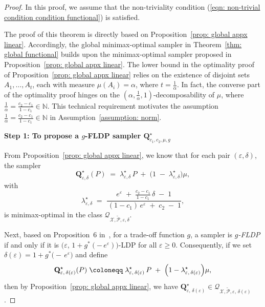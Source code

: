 \documentclass[accepted]{article}
\theoremstyle{plain} %
\theoremstyle{definition}
\theoremstyle{remark}
\newcommand{\bQ}{\mathbf{Q}}
\begin{document}
\begin{proof}
In this proof, we assume that the non-triviality condition (\ref{eqn: non-trivial condition condition functional}) is satisfied.



The proof of this theorem is directly based on Proposition~\ref{prop: global appx linear}. Accordingly, the global minimax-optimal sampler in Theorem~\ref{thm: global functional} builds upon the minimax-optimal sampler proposed in Proposition~\ref{prop: global appx linear}. The lower bound in the optimality proof of Proposition~\ref{prop: global appx linear} relies on the existence of disjoint sets \( A_1, \ldots, A_t \), each with measure \( \mu(A_i) = \alpha \), where \( t = \frac{1}{\alpha} \). In fact, the converse part of the optimality proof hinges on the \( (\alpha, \frac{1}{\alpha}, 1) \)-decomposability of \( \mu \), where \( \frac{1}{\alpha} = \frac{c_2 - c_1}{1 - c_1} \in \mathbb{N} \). This technical requirement motivates the assumption \( \frac{1}{\alpha} = \frac{c_2 - c_1}{1 - c_1} \in \mathbb{N} \) in Assumption~\ref{assumption: norm}.

\textbf{Step 1: To propose a $g$-FLDP sampler $\bQ^\star_{c_1,c_2,\mu,g}$} 

    From Proposition~\ref{prop: global appx linear}, we know that for each pair $(\varepsilon, \delta)$, the sampler
\[
\bQ^\star_{\varepsilon, \delta}(P) 
\;=\; 
\lambda^\star_{\varepsilon, \delta}\,P \;+\; \bigl(1 \;-\; \lambda^\star_{\varepsilon, \delta}\bigr)\mu,
\]
with 
\[
\lambda^\star_{\varepsilon, \delta} 
\;=\;
\frac{e^{\varepsilon} \;+\; \tfrac{c_2 - c_1}{1 - c_1}\,\delta \;-\; 1}
     {\,(1 - c_1)\,e^{\varepsilon} \;+\; c_2 \;-\; 1},
\]
is minimax-optimal in the class $\mathcal{Q}_{\mathcal{X}, \tilde{\mathcal{P}}, \varepsilon, \delta}$.

Next, based on Proposition~6 in~\citet{dong2022gaussian}, for a trade-off function $g$, a sampler is \emph{$g$-FLDP} if and only if it is $\bigl(\varepsilon,\,1 + g^*(-\,e^\varepsilon)\bigr)$-LDP for all $\varepsilon \ge 0$. Consequently, if we set $\delta(\varepsilon) = 1 + g^*\!\bigl(-\,e^\varepsilon\bigr)$ and define 
\[
\bQ^\star_{\varepsilon,\,\delta(\varepsilon)}(P) 
\;\coloneqq\; 
\lambda^\star_{\varepsilon,\,\delta(\varepsilon)}\,P \;+\; \Bigl(1 - \lambda^\star_{\varepsilon,\,\delta(\varepsilon)}\Bigr)\mu,
\]
then by Proposition~\ref{prop: global appx linear}, we have $\bQ^\star_{\varepsilon,\,\delta(\varepsilon)} \in \mathcal{Q}_{\mathcal{X}, \tilde{\mathcal{P}}, \varepsilon, \,\delta(\varepsilon)}$. 


\end{proof}
\end{document}

